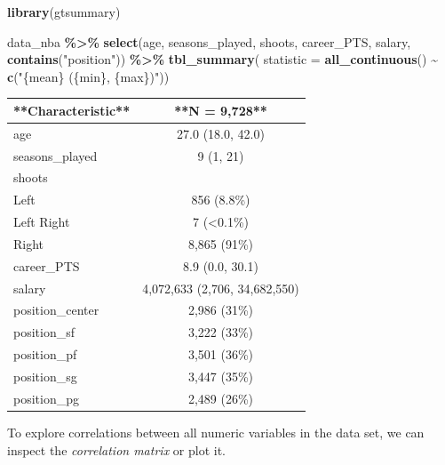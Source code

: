 \documentclass[
]{book}
\newenvironment{Shaded}{\begin{snugshade}}{\end{snugshade}}
\newcommand{\AttributeTok}[1]{\textcolor[rgb]{0.13,0.29,0.53}{#1}}
\newcommand{\FunctionTok}[1]{\textcolor[rgb]{0.13,0.29,0.53}{\textbf{#1}}}
\newcommand{\NormalTok}[1]{#1}
\newcommand{\SpecialCharTok}[1]{\textcolor[rgb]{0.81,0.36,0.00}{\textbf{#1}}}
\newcommand{\StringTok}[1]{\textcolor[rgb]{0.31,0.60,0.02}{#1}}
\begin{document}
\begin{Shaded}
\begin{Highlighting}[]
\FunctionTok{library}\NormalTok{(gtsummary)}

\NormalTok{data\_nba }\SpecialCharTok{\%\textgreater{}\%} 
  \FunctionTok{select}\NormalTok{(age, seasons\_played, shoots, career\_PTS, salary, }\FunctionTok{contains}\NormalTok{(}\StringTok{"position"}\NormalTok{)) }\SpecialCharTok{\%\textgreater{}\%}
         \FunctionTok{tbl\_summary}\NormalTok{(}
           \AttributeTok{statistic =} \FunctionTok{all\_continuous}\NormalTok{() }\SpecialCharTok{\textasciitilde{}} \FunctionTok{c}\NormalTok{(}\StringTok{"\{mean\} (\{min\}, \{max\})"}\NormalTok{)) }
\end{Highlighting}
\end{Shaded}

\begin{tabular}{l|c}
\hline
**Characteristic** & **N = 9,728**\\
\hline
age & 27.0 (18.0, 42.0)\\
\hline
seasons\_played & 9 (1, 21)\\
\hline
shoots & \\
\hline
Left & 856 (8.8\%)\\
\hline
Left Right & 7 (<0.1\%)\\
\hline
Right & 8,865 (91\%)\\
\hline
career\_PTS & 8.9 (0.0, 30.1)\\
\hline
salary & 4,072,633 (2,706, 34,682,550)\\
\hline
position\_center & 2,986 (31\%)\\
\hline
position\_sf & 3,222 (33\%)\\
\hline
position\_pf & 3,501 (36\%)\\
\hline
position\_sg & 3,447 (35\%)\\
\hline
position\_pg & 2,489 (26\%)\\
\hline
\end{tabular}

To explore correlations between all numeric variables in the data set, we can inspect the \emph{correlation matrix} or plot it.
\end{document}
